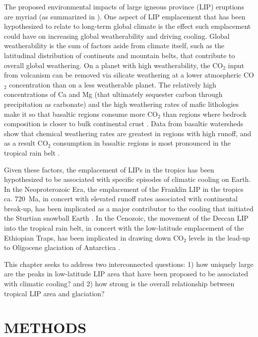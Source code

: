 \documentclass[11pt,letterpaper]{article}
\begin{document}
The proposed environmental impacts of large igneous province (LIP) eruptions are myriad (as summarized in \citealp{Ernst2017a}). One aspect of LIP emplacement that has been hypothesized to relate to long-term global climate is the effect such emplacement could have on increasing global weatherability and driving cooling. Global weatherability is the sum of factors aside from climate itself, such as the latitudinal distribution of continents and mountain belts, that contribute to overall global weathering. On a planet with high weatherability, the CO$_2$ input from volcanism can be removed via silicate weathering at a lower atmospheric CO$_2$ concentration than on a less weatherable planet. The relatively high concentrations of Ca and Mg (that ultimately sequester carbon through precipitation as carbonate) and the high weathering rates of mafic lithologies make it so that basaltic regions consume more CO$_2$ than regions where bedrock composition is closer to bulk continental crust \citep{Dessert2003a}. Data from basaltic watersheds show that chemical weathering rates are greatest in regions with high runoff, and as a result CO$_2$ consumption in basaltic regions is most pronounced in the tropical rain belt \citep{Dessert2003a, Hartmann2014a}.

Given these factors, the emplacement of LIPs in the tropics has been hypothesized to be associated with specific episodes of climatic cooling on Earth. In the Neoproterozoic Era, the emplacement of the Franklin LIP in the tropics ca. 720~Ma, in concert with elevated runoff rates associated with continental break-up, has been implicated as a major contributor to the cooling that initiated the Sturtian snowball Earth \citep{Donnadieu2004b, Cox2016a}. In the Cenozoic, the movement of the Deccan LIP into the tropical rain belt, in concert with the low-latitude emplacement of the Ethiopian Traps, has been implicated in drawing down CO$_2$ levels in the lead-up to Oligocene glaciation of Antarctica \citep{Kent2008a,Kent2013a}.

This chapter seeks to address two interconnected questions: 1) how uniquely large are the peaks in low-latitude LIP area that have been proposed to be associated with climatic cooling? and 2) how strong is the overall relationship between tropical LIP area and glaciation?

\section*{METHODS}
\end{document}
